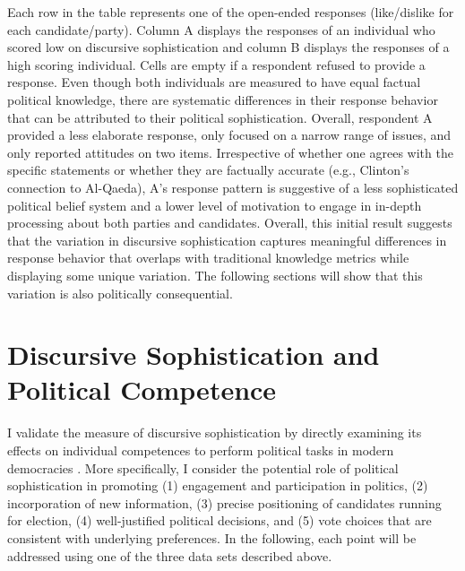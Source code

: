 Each row in the table represents one of the open-ended responses (like/dislike for each candidate/party). Column A displays the responses of an individual who scored low on discursive sophistication and column B displays the responses of a high scoring individual. Cells are empty if a respondent refused to provide a response. Even though both individuals are measured to have equal factual political knowledge, there are systematic differences in their response behavior that can be attributed to their political sophistication. Overall, respondent A provided a less elaborate response, only focused on a narrow range of issues, and only reported attitudes on two items. Irrespective of whether one agrees with the specific statements or whether they are factually accurate (e.g., Clinton's connection to Al-Qaeda), A's response pattern is suggestive of a less sophisticated political belief system and a lower level of motivation to engage in in-depth processing about both parties and candidates. Overall, this initial result suggests that the variation in discursive sophistication captures meaningful differences in response behavior that overlaps with traditional knowledge metrics while displaying some unique variation. The following sections will show that this variation is also politically consequential.



\section{Discursive Sophistication and Political Competence}

I validate the measure of discursive sophistication by directly examining its effects on individual competences to perform political tasks in modern democracies \citep[c.f.,][]{lupia2006elitism,lupia2015uninformed}. More specifically, I consider the potential role of political sophistication in promoting (1) engagement and participation in politics, (2) incorporation of new information, (3) precise positioning of candidates running for election, (4) well-justified political decisions, and (5) vote choices that are consistent with underlying preferences. In the following, each point will be addressed using one of the three data sets described above.


